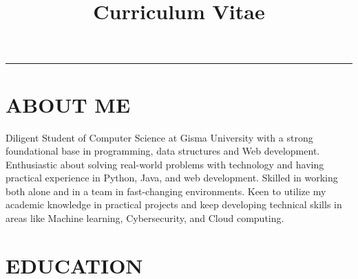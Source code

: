 \documentclass[12pt,a4paper]{moderncv}
\title{Curriculum Vitae}
\begin{document}
\makecvtitle
\vspace{-2em}
\hrule
\vspace{1em}







\section{\textbf{ABOUT ME}}
    Diligent Student of Computer Science at Gisma University with a strong foundational base in programming, data structures and Web development. Enthusiastic about solving real-world problems with technology and having practical experience in Python, Java, and web development. Skilled in working both alone and in a team in fast-changing environments. Keen to utilize my academic knowledge in practical projects and keep developing technical skills in areas like Machine learning, Cybersecurity, and Cloud computing.

\vspace{0.5cm}







\section{\textbf{EDUCATION}}
\end{document}
